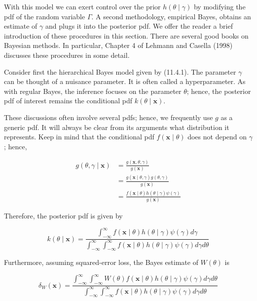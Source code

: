 With this model we can exert control over the prior $h(\theta \mid \gamma)$ by modifying the pdf of the random variable $\Gamma$. A second methodology, empirical Bayes, obtains an estimate of $\gamma$ and plugs it into the posterior pdf. We offer the reader a brief introduction of these procedures in this section. There are several good books on Bayesian methods. In particular, Chapter 4 of Lehmann and Casella (1998) discusses these procedures in some detail.

Consider first the hierarchical Bayes model given by (11.4.1). The parameter $\gamma$ can be thought of a nuisance parameter. It is often called a hyperparameter. As with regular Bayes, the inference focuses on the parameter $\theta$; hence, the posterior pdf of interest remains the conditional pdf $k(\theta \mid \mathbf{x})$.

These discussions often involve several pdfs; hence, we frequently use $g$ as a generic pdf. It will always be clear from its arguments what distribution it represents. Keep in mind that the conditional pdf $f(\mathbf{x} \mid \theta)$ does not depend on $\gamma$; hence,

$$
\begin{aligned}
g(\theta, \gamma \mid \mathbf{x}) & =\frac{g(\mathbf{x}, \theta, \gamma)}{g(\mathbf{x})} \\
& =\frac{g(\mathbf{x} \mid \theta, \gamma) g(\theta, \gamma)}{g(\mathbf{x})} \\
& =\frac{f(\mathbf{x} \mid \theta) h(\theta \mid \gamma) \psi(\gamma)}{g(\mathbf{x})}
\end{aligned}
$$

Therefore, the posterior pdf is given by


\begin{equation*}
k(\theta \mid \mathbf{x})=\frac{\int_{-\infty}^{\infty} f(\mathbf{x} \mid \theta) h(\theta \mid \gamma) \psi(\gamma) d \gamma}{\int_{-\infty}^{\infty} \int_{-\infty}^{\infty} f(\mathbf{x} \mid \theta) h(\theta \mid \gamma) \psi(\gamma) d \gamma d \theta} \tag{11.4.2}
\end{equation*}


Furthermore, assuming squared-error loss, the Bayes estimate of $W(\theta)$ is


\begin{equation*}
\delta_{W}(\mathbf{x})=\frac{\int_{-\infty}^{\infty} \int_{-\infty}^{\infty} W(\theta) f(\mathbf{x} \mid \theta) h(\theta \mid \gamma) \psi(\gamma) d \gamma d \theta}{\int_{-\infty}^{\infty} \int_{-\infty}^{\infty} f(\mathbf{x} \mid \theta) h(\theta \mid \gamma) \psi(\gamma) d \gamma d \theta} \tag{11.4.3}
\end{equation*}


